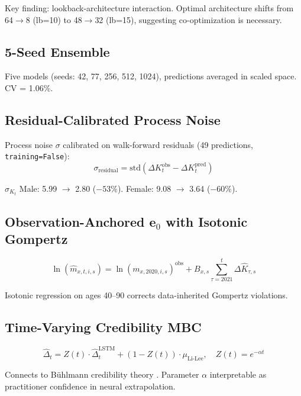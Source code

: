 \documentclass[11pt,a4paper]{article}
\begin{document}
Key finding: lookback-architecture interaction. Optimal architecture shifts from 64$\to$8 (lb=10) to 48$\to$32 (lb=15), suggesting co-optimization is necessary.

\subsection{5-Seed Ensemble}

Five models (seeds: 42, 77, 256, 512, 1024), predictions averaged in scaled space. CV = 1.06\%.

\subsection{Residual-Calibrated Process Noise}

Process noise $\sigma$ calibrated on walk-forward residuals (49 predictions, \texttt{training=False}):
\begin{equation}
    \sigma_{\text{residual}} = \text{std}(\Delta K_t^{\text{obs}} - \Delta K_t^{\text{pred}})
\end{equation}

$\sigma_{K_t}$ Male: 5.99 $\to$ 2.80 ($-53\%$). Female: 9.08 $\to$ 3.64 ($-60\%$).

\subsection{Observation-Anchored e$_0$ with Isotonic Gompertz}

\begin{equation}
    \ln(\hat{m}_{x,t,i,s}) = \ln(m_{x,2020,i,s})^{\text{obs}} + B_{x,s} \sum_{\tau=2021}^{t} \Delta \hat{K}_{\tau,s}
\end{equation}

Isotonic regression on ages 40--90 corrects data-inherited Gompertz violations.

\subsection{Time-Varying Credibility MBC}

\begin{equation}
    \hat{\Delta}_t = Z(t) \cdot \hat{\Delta}_t^{\text{LSTM}} + (1 - Z(t)) \cdot \mu_{\text{Li-Lee}}, \quad Z(t) = e^{-\alpha t}
\end{equation}

Connects to B\"uhlmann credibility theory \cite{buhlmann1967}. Parameter $\alpha$ interpretable as practitioner confidence in neural extrapolation.
\end{document}
